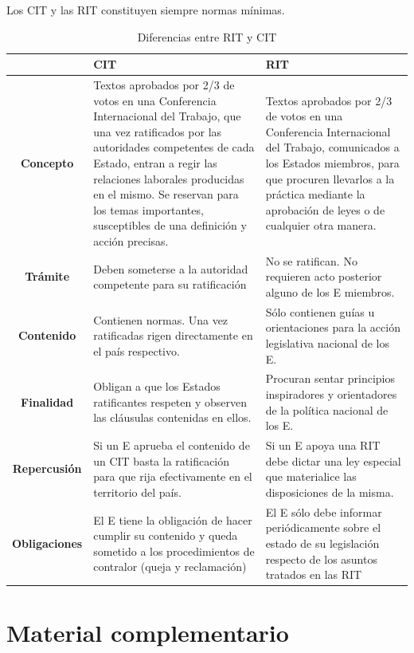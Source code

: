 \documentclass[spanish,12pt,a4paper,titlepage]{report}
\begin{document}
Los CIT y las RIT constituyen siempre normas mínimas.
\begin{table}
\begin{tabular}{|c||p{6cm}|p{6cm}|}
  \hline
  & \textbf{CIT} & \textbf{RIT}\\
  \hline
  \hline
  \textbf{Concepto} & Textos aprobados por 2/3 de votos en una Conferencia Internacional del Trabajo, que una vez ratificados por las autoridades competentes de cada Estado, entran a regir las relaciones laborales producidas en el mismo. Se reservan para los temas importantes, susceptibles de una definición y acción precisas. & Textos aprobados por 2/3 de votos en una Conferencia Internacional del Trabajo, comunicados a los Estados miembros, para que procuren llevarlos a la práctica mediante la aprobación de leyes o de  cualquier otra manera.\\
  \hline
  \textbf{Trámite} & Deben someterse a la autoridad competente para su ratificación & No se ratifican. No requieren acto posterior alguno de los E miembros.\\
  \hline
  \textbf{Contenido} & Contienen normas. Una vez ratificadas rigen directamente en el país respectivo. & Sólo contienen guías u orientaciones para la acción legislativa nacional de los E.\\
  \hline
  \textbf{Finalidad} & Obligan a que los Estados ratificantes respeten y observen las cláusulas contenidas en ellos. & Procuran sentar principios inspiradores y orientadores de la política nacional de los E.\\
  \hline
  \textbf{Repercusión} & Si un E aprueba el contenido de un CIT basta la ratificación para que rija efectivamente en el territorio del país. & Si un E apoya una RIT debe dictar una ley especial que materialice las disposiciones de la misma.\\
  \hline
  \textbf{Obligaciones} & El E tiene la obligación de hacer cumplir su contenido y queda sometido a los procedimientos de contralor (queja y reclamación) & El E sólo debe informar periódicamente sobre el estado de su legislación respecto de los asuntos tratados en las RIT\\
  \hline
\end{tabular}
\caption{Diferencias entre RIT y CIT}
\label{tab:rit-cit}
\end{table}
\newpage
\section{Material complementario}
\label{sec:material-complementario}
\end{document}
